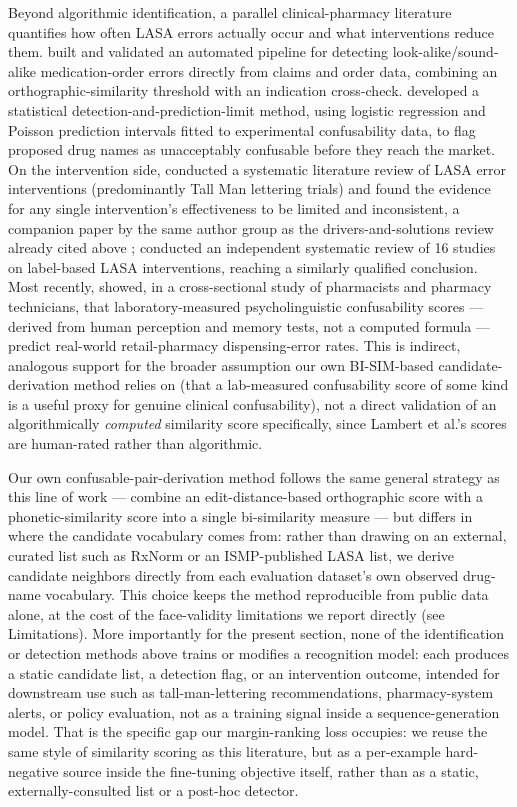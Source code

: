 \documentclass[fleqn,10pt]{wlpeerj}
\begin{document}
Beyond algorithmic identification, a parallel clinical-pharmacy literature quantifies how often LASA errors actually occur and what interventions reduce them. \citet{rashfoanio2017automated} built and validated an automated pipeline for detecting look-alike/sound-alike medication-order errors directly from claims and order data, combining an orthographic-similarity threshold with an indication cross-check. \citet{lambert2015detection} developed a statistical detection-and-prediction-limit method, using logistic regression and Poisson prediction intervals fitted to experimental confusability data, to flag proposed drug names as unacceptably confusable before they reach the market. On the intervention side, \citet{bryan2021systematic} conducted a systematic literature review of LASA error interventions (predominantly Tall Man lettering trials) and found the evidence for any single intervention's effectiveness to be limited and inconsistent, a companion paper by the same author group as the drivers-and-solutions review already cited above \citep{bryan2021problem}; \citet{larmenebeld2018systematic} conducted an independent systematic review of 16 studies on label-based LASA interventions, reaching a similarly qualified conclusion. Most recently, \citet{lambert2025psycholinguistic} showed, in a cross-sectional study of pharmacists and pharmacy technicians, that laboratory-measured psycholinguistic confusability scores --- derived from human perception and memory tests, not a computed formula --- predict real-world retail-pharmacy dispensing-error rates. This is indirect, analogous support for the broader assumption our own BI-SIM-based candidate-derivation method relies on (that a lab-measured confusability score of some kind is a useful proxy for genuine clinical confusability), not a direct validation of an algorithmically \emph{computed} similarity score specifically, since Lambert et al.'s scores are human-rated rather than algorithmic.

Our own confusable-pair-derivation method follows the same general strategy as this line of work --- combine an edit-distance-based orthographic score with a phonetic-similarity score into a single bi-similarity measure --- but differs in where the candidate vocabulary comes from: rather than drawing on an external, curated list such as RxNorm or an ISMP-published LASA list, we derive candidate neighbors directly from each evaluation dataset's own observed drug-name vocabulary. This choice keeps the method reproducible from public data alone, at the cost of the face-validity limitations we report directly (see Limitations). More importantly for the present section, none of the identification or detection methods above trains or modifies a recognition model: each produces a static candidate list, a detection flag, or an intervention outcome, intended for downstream use such as tall-man-lettering recommendations, pharmacy-system alerts, or policy evaluation, not as a training signal inside a sequence-generation model. That is the specific gap our margin-ranking loss occupies: we reuse the same style of similarity scoring as this literature, but as a per-example hard-negative source inside the fine-tuning objective itself, rather than as a static, externally-consulted list or a post-hoc detector.
\end{document}
